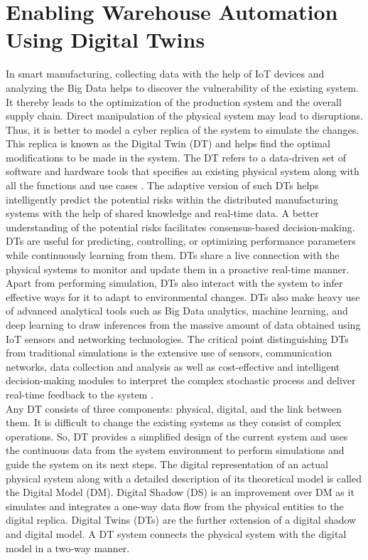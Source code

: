 \documentclass[paper=a4wide, fontsize=12pt]{scrartcl}
\begin{document}
\section{Enabling Warehouse Automation Using Digital Twins}

In smart manufacturing, collecting data with the help of IoT devices and analyzing the Big Data helps to discover the vulnerability of the existing system. It thereby leads to the optimization of the production system and the overall supply chain. Direct manipulation of the physical system may lead to disruptions. Thus, it is better to model a cyber replica of the system to simulate the changes. This replica is known as the Digital Twin (DT) and helps find the optimal modifications to be made in the system. The DT refers to a data-driven set of software and hardware tools that specifies an existing physical system along with all the functions and use cases \cite{fi14020064}. The adaptive version of such DTs helps intelligently predict the potential risks within the distributed manufacturing systems with the help of shared knowledge and real-time data. A better understanding of the potential risks facilitates consensus-based decision-making. \\

DTs are useful for predicting, controlling, or optimizing performance parameters while continuously learning from them. DTs share a live connection with the physical systems to monitor and update them in a proactive real-time manner. Apart from performing simulation, DTs also interact with the system to infer effective ways for it to adapt to environmental changes. DTs also make heavy use of advanced analytical tools such as Big Data analytics, machine learning, and deep learning to draw inferences from the massive amount of data obtained using IoT sensors and networking technologies. The critical point distinguishing DTs from traditional simulations is the extensive use of sensors, communication networks, data collection and analysis as well as cost-effective and intelligent decision-making modules to interpret the complex stochastic process and deliver real-time feedback to the system \cite{fi14020064}. \\

Any DT consists of three components: physical, digital, and the link between them. It is difficult to change the existing systems as they consist of complex operations. So, DT provides a simplified design of the current system and uses the continuous data from the system environment to perform simulations and guide the system on its next steps. The digital representation of an actual physical system along with a detailed description of its theoretical model is called the Digital Model (DM). Digital Shadow (DS) is an improvement over DM as it simulates and integrates a one-way data flow from the physical entities to the digital replica. Digital Twins (DTs) are the further extension of a digital shadow and digital model. A DT system connects the physical system with the digital model in a two-way manner. \\
\end{document}
